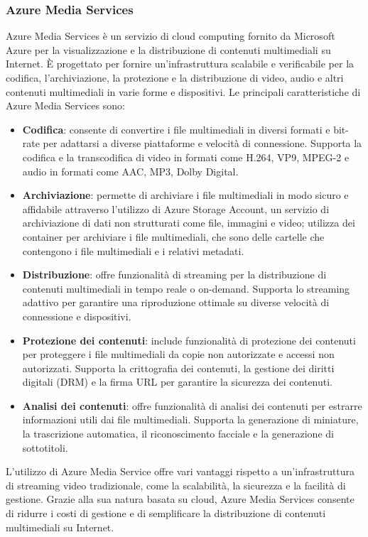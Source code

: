 \subsubsection{Azure Media Services}
Azure Media Services è un servizio di cloud computing fornito da Microsoft Azure per la visualizzazione e la distribuzione di contenuti multimediali su Internet. È progettato per fornire un'infrastruttura scalabile e verificabile per la codifica, l'archiviazione, la protezione e la distribuzione di video, audio e altri contenuti multimediali in varie forme e dispositivi.
Le principali caratteristiche di Azure Media Services sono:
\begin{itemize}
    \item \textbf{Codifica}: consente di convertire i file multimediali in diversi formati e bit-rate per adattarsi a diverse piattaforme e velocità di connessione. Supporta la codifica e la transcodifica di video in formati come H.264, VP9, MPEG-2 e audio in formati come AAC, MP3, Dolby Digital.
    \item \textbf{Archiviazione}: permette di archiviare i file multimediali in modo sicuro e affidabile attraverso l'utilizzo di Azure Storage Account, un servizio di archiviazione di dati non strutturati come file, immagini e video; utilizza dei container per archiviare i file multimediali, che sono delle cartelle che contengono i file multimediali e i relativi metadati.
    \item \textbf{Distribuzione}:
    offre funzionalità di streaming per la distribuzione di contenuti multimediali in tempo reale o on-demand. Supporta lo streaming adattivo per garantire una riproduzione ottimale su diverse velocità di connessione e dispositivi.\\
    \item \textbf{Protezione dei contenuti}: include funzionalità di protezione dei contenuti per proteggere i file multimediali da copie non autorizzate e accessi non autorizzati. Supporta la crittografia dei contenuti, la gestione dei diritti digitali (DRM) e la firma URL per garantire la sicurezza dei contenuti.
    \item \textbf{Analisi dei contenuti}: offre funzionalità di analisi dei contenuti per estrarre informazioni utili dai file multimediali. Supporta la generazione di miniature, la trascrizione automatica, il riconoscimento facciale e la generazione di sottotitoli.
\end{itemize}
L'utilizzo di Azure Media Service offre vari vantaggi rispetto a un'infrastruttura di streaming video tradizionale, come la scalabilità, la sicurezza e la facilità di gestione. Grazie alla sua natura basata su cloud, Azure Media Services consente di ridurre i costi di gestione e di semplificare la distribuzione di contenuti multimediali su Internet.
